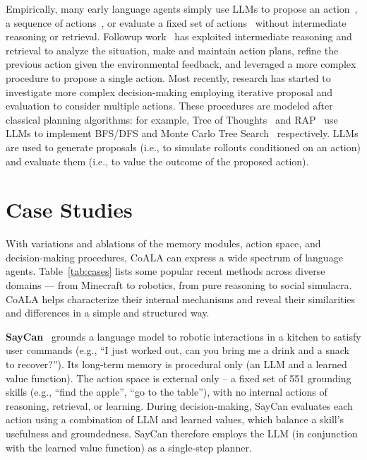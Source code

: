 \documentclass[10pt]{article} %
\begin{document}
Empirically, many early language agents simply use LLMs to propose an action~\citep{schick2023toolformer}, a sequence of actions~\citep{huang2022language}, or evaluate a fixed set of actions~\citep{ahn2022can} without intermediate reasoning or retrieval. 
Followup work~\citep{yao2022react, shinn2023reflexion, xu2023rewoo, lin2023swiftsage, wang2023voyager, park2023generative} has exploited intermediate reasoning and retrieval to analyze the situation, make and maintain action plans, refine the previous action given the environmental feedback, and leveraged a more complex procedure to propose a single action.
Most recently, research has started to investigate more complex decision-making employing iterative proposal and evaluation to consider multiple actions. These procedures are modeled after classical planning algorithms: for example, Tree of Thoughts~\citep{yao2023tree} and RAP~\citep{hao2023reasoning} use LLMs to implement BFS/DFS and Monte Carlo Tree Search~\citep[MCTS;][]{browne2012survey} respectively. LLMs are used to generate proposals (i.e., to simulate rollouts conditioned on an action) and evaluate them (i.e., to value the outcome of the proposed action).


\section{Case Studies} \label{sec:cases}
With variations and ablations of the memory modules, action space, and decision-making procedures, CoALA can express a wide spectrum of language agents. Table~\ref{tab:cases} lists some popular recent methods across diverse domains --- from Minecraft to robotics, from pure reasoning to social simulacra. CoALA helps characterize their internal mechanisms and reveal their similarities and differences in a simple and structured way. 




\textbf{SayCan}~\citep{ahn2022can} grounds a language model to robotic interactions in a kitchen to satisfy user commands (e.g., ``I just worked out, can you bring me a drink and a snack to recover?''). Its long-term memory is procedural only (an LLM and a learned value function). The action space is external only -- a fixed set of 551 grounding skills (e.g., ``find the apple'', ``go to the table''), with no internal actions of reasoning, retrieval, or learning. During decision-making, SayCan evaluates each action using a combination of LLM and learned values, which balance a skill's usefulness and groundedness. SayCan therefore employs the LLM (in conjunction with the learned value function) as a single-step planner. 
\end{document}
